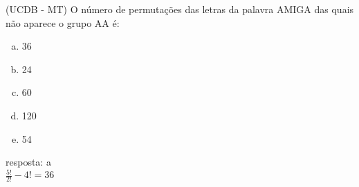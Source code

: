 \begin{ex}
(UCDB - MT) O número de permutações das letras da palavra AMIGA das quais não aparece o grupo AA é:
   \begin{enumerate}[(a)]
   \item 36
   \item 24
   \item 60
   \item 120
   \item 54
   \end{enumerate}
    \begin{sol}
     resposta: a \\
     $\frac{5!}{2!} - 4!=36$
    \end{sol}
\end{ex}